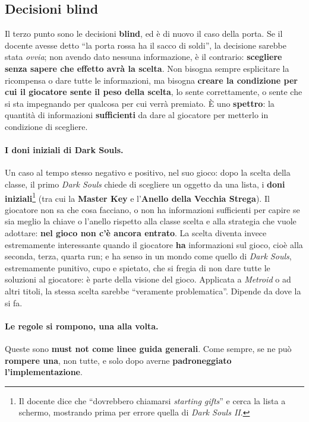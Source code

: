 \subsection{Decisioni blind}

Il terzo punto sono le decisioni \textbf{blind}, ed è di nuovo il caso della
porta. Se il docente avesse detto ``la porta rossa ha il sacco di soldi'',
la decisione sarebbe stata \emph{ovvia}; non avendo dato nessuna
informazione, è il contrario: \textbf{scegliere senza sapere che effetto
avrà la scelta}. Non bisogna sempre esplicitare la ricompensa o dare tutte le
informazioni, ma bisogna \textbf{creare la condizione per cui il giocatore
sente il peso della scelta}, lo sente correttamente, o sente che si sta
impegnando per qualcosa per cui verrà premiato. È uno \textbf{spettro}: la
quantità di informazioni \textbf{sufficienti} da dare al giocatore per
metterlo in condizione di scegliere.

\paragraph{I doni iniziali di Dark Souls.} Un caso al tempo stesso negativo e
positivo, nel suo gioco: dopo la scelta della classe, il primo \emph{Dark
Souls} chiede di scegliere un oggetto da una lista, i \textbf{doni
iniziali}\footnote{Il docente dice che ``dovrebbero chiamarsi
\emph{starting gifts}'' e cerca la lista a schermo, mostrando prima per
errore quella di \emph{Dark Souls II}.} (tra cui la \textbf{Master Key} e
l'\textbf{Anello della Vecchia Strega}). Il giocatore non sa che cosa
facciano, o non ha informazioni sufficienti per capire se sia meglio la
chiave o l'anello rispetto alla classe scelta e alla strategia che vuole
adottare: \textbf{nel gioco non c'è ancora entrato}. La scelta diventa invece
estremamente interessante quando il giocatore \textbf{ha} informazioni sul
gioco, cioè alla seconda, terza, quarta run; e ha senso in un mondo come
quello di \emph{Dark Souls}, estremamente punitivo, cupo e spietato, che si
fregia di non dare tutte le soluzioni al giocatore: è parte della visione
del gioco. Applicata a \emph{Metroid} o ad altri titoli, la stessa scelta
sarebbe ``veramente problematica''. Dipende da dove la si fa.

\paragraph{Le regole si rompono, una alla volta.} Queste sono \textbf{must
not come linee guida generali}. Come sempre, se ne può \textbf{rompere una},
non tutte, e solo dopo averne \textbf{padroneggiato l'implementazione}.

